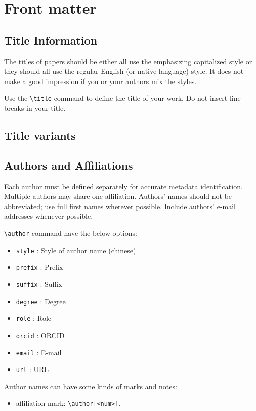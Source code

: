 \documentclass[
]{ceurart}
\begin{document}
\section{Front matter}

\subsection{Title Information}

The titles of papers should be either all use the emphasizing
capitalized style or they should all use the regular English (or
native language) style. It does not make a good impression if you or
your authors mix the styles.

Use the \verb|\title| command to define the title of your work. Do not
insert line breaks in your title.

\subsection{Title variants}


\subsection{Authors and Affiliations}

Each author must be defined separately for accurate metadata
identification. Multiple authors may share one affiliation. Authors'
names should not be abbreviated; use full first names wherever
possible. Include authors' e-mail addresses whenever possible.

\verb|\author| command have the below options: 

\begin{itemize}
\item \verb|style| : Style of author name (chinese)
\item \verb|prefix| : Prefix
\item \verb|suffix| : Suffix
\item \verb|degree| : Degree
\item \verb|role| : Role
\item \verb|orcid| : ORCID
\item \verb|email| : E-mail
\item \verb|url| : URL
\end{itemize}

Author names can have some kinds of marks and notes:
\begin{itemize}
\item affiliation mark: \verb|\author[<num>]|.
\end{itemize}
\end{document}

